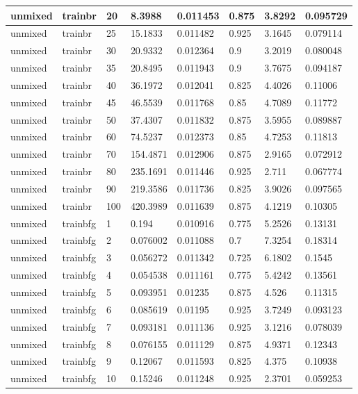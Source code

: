 \begin{longtable}{llllllll}
unmixed & trainbr & 20 & 8.3988 & 0.011453 & 0.875 & 3.8292 & 0.095729 \\ \hline 
unmixed & trainbr & 25 & 15.1833 & 0.011482 & 0.925 & 3.1645 & 0.079114 \\ \hline 
unmixed & trainbr & 30 & 20.9332 & 0.012364 & 0.9 & 3.2019 & 0.080048 \\ \hline 
unmixed & trainbr & 35 & 20.8495 & 0.011943 & 0.9 & 3.7675 & 0.094187 \\ \hline 
unmixed & trainbr & 40 & 36.1972 & 0.012041 & 0.825 & 4.4026 & 0.11006 \\ \hline 
unmixed & trainbr & 45 & 46.5539 & 0.011768 & 0.85 & 4.7089 & 0.11772 \\ \hline 
unmixed & trainbr & 50 & 37.4307 & 0.011832 & 0.875 & 3.5955 & 0.089887 \\ \hline 
unmixed & trainbr & 60 & 74.5237 & 0.012373 & 0.85 & 4.7253 & 0.11813 \\ \hline 
unmixed & trainbr & 70 & 154.4871 & 0.012906 & 0.875 & 2.9165 & 0.072912 \\ \hline 
unmixed & trainbr & 80 & 235.1691 & 0.011446 & 0.925 & 2.711 & 0.067774 \\ \hline 
unmixed & trainbr & 90 & 219.3586 & 0.011736 & 0.825 & 3.9026 & 0.097565 \\ \hline 
unmixed & trainbr & 100 & 420.3989 & 0.011639 & 0.875 & 4.1219 & 0.10305 \\ \hline 
unmixed & trainbfg & 1 & 0.194 & 0.010916 & 0.775 & 5.2526 & 0.13131 \\ \hline 
unmixed & trainbfg & 2 & 0.076002 & 0.011088 & 0.7 & 7.3254 & 0.18314 \\ \hline 
unmixed & trainbfg & 3 & 0.056272 & 0.011342 & 0.725 & 6.1802 & 0.1545 \\ \hline 
unmixed & trainbfg & 4 & 0.054538 & 0.011161 & 0.775 & 5.4242 & 0.13561 \\ \hline 
unmixed & trainbfg & 5 & 0.093951 & 0.01235 & 0.875 & 4.526 & 0.11315 \\ \hline 
unmixed & trainbfg & 6 & 0.085619 & 0.01195 & 0.925 & 3.7249 & 0.093123 \\ \hline 
unmixed & trainbfg & 7 & 0.093181 & 0.011136 & 0.925 & 3.1216 & 0.078039 \\ \hline 
unmixed & trainbfg & 8 & 0.076155 & 0.011129 & 0.875 & 4.9371 & 0.12343 \\ \hline 
unmixed & trainbfg & 9 & 0.12067 & 0.011593 & 0.825 & 4.375 & 0.10938 \\ \hline 
unmixed & trainbfg & 10 & 0.15246 & 0.011248 & 0.925 & 2.3701 & 0.059253 \\ \hline 

\end{longtable}
